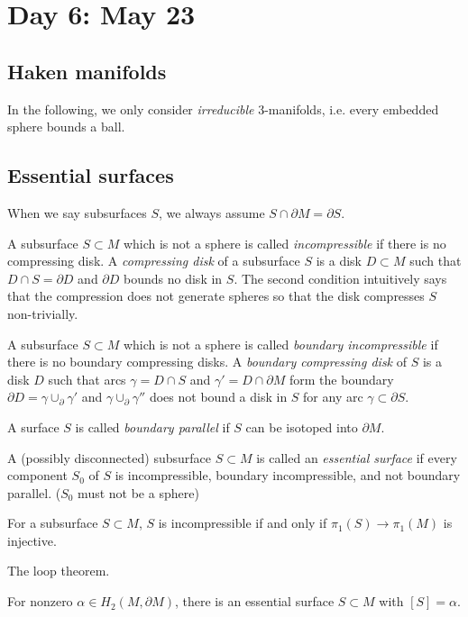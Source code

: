 \documentclass{../../small}
\begin{document}
\newpage
\setcounter{section}{5}
\section{Day 6: May 23}
\setcounter{section}{5}
\subsection*{Haken manifolds}
In the following, we only consider \emph{irreducible} 3-manifolds, i.e. every embedded sphere bounds a ball.

\subsection{Essential surfaces}
When we say subsurfaces $S$, we always assume $S\cap\partial M=\partial S$.

A subsurface $S\subset M$ which is not a sphere is called \emph{incompressible} if there is no compressing disk.
A \emph{compressing disk} of a subsurface $S$ is a disk $D\subset M$ such that $D\cap S=\partial D$ and $\partial D$ bounds no disk in $S$.
The second condition intuitively says that the compression does not generate spheres so that the disk compresses $S$ non-trivially.

A subsurface $S\subset M$ which is not a sphere is called \emph{boundary incompressible} if there is no boundary compressing disks.
A \emph{boundary compressing disk} of $S$ is a disk $D$ such that arcs $\gamma=D\cap S$ and $\gamma'=D\cap\partial M$ form the boundary $\partial D=\gamma\cup_\partial\gamma'$ and $\gamma\cup_\partial\gamma''$ does not bound a disk in $S$ for any arc $\gamma\subset\partial S$.

A surface $S$ is called \emph{boundary parallel} if $S$ can be isotoped into $\partial M$.

A (possibly disconnected) subsurface $S\subset M$ is called an \emph{essential surface} if every component $S_0$ of $S$ is incompressible, boundary incompressible, and not boundary parallel. ($S_0$ must not be a sphere)

\begin{prop}
For a subsurface $S\subset M$, $S$ is incompressible if and only if $\pi_1(S)\to\pi_1(M)$ is injective.
\end{prop}
\begin{pf}
The loop theorem.
\end{pf}
\begin{prop}
For nonzero $\alpha\in H_2(M,\partial M)$, there is an essential surface $S\subset M$ with $[S]=\alpha$.
\end{prop}
\end{document}
